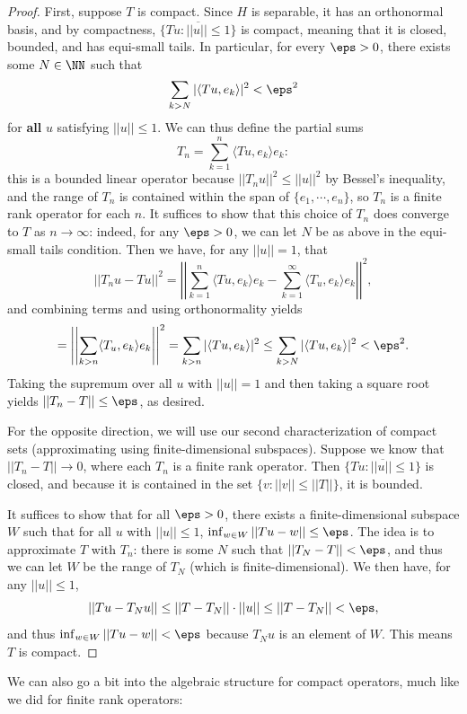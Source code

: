 \begin{proof}
First, suppose $T$ is compact. Since $H$ is separable, it has an orthonormal basis, and by compactness, $\overline{\{Tu: ||u|| \le 1\}}$ is compact, meaning that it is closed, bounded, and has equi-small tails. In particular, for every $\eps > 0$, there exists some $N \in \NN$ such that 
\[
    \sum_{k>N}|\langle Tu, e_k \rangle|^2 < \eps^2
\]
for \textbf{all} $u$ satisfying $||u|| \le 1$. We can thus define the partial sums
\[
    T_n = \sum_{k=1}^n \langle Tu, e_k \rangle e_k:
\]
this is a bounded linear operator because $||T_n u||^2 \le ||u||^2$ by Bessel's inequality, and the range of $T_n$ is contained within the span of $\{e_1, \cdots, e_n\}$, so $T_n$ is a finite rank operator for each $n$. It suffices to show that this choice of $T_n$ does converge to $T$ as $n \to \infty$: indeed, for any $\eps > 0$, we can let $N$ be as above in the equi-small tails condition. Then we have, for any $||u|| = 1$, that
\[
    ||T_n u - Tu||^2 = \left|\left| \sum_{k=1}^n \langle Tu, e_k \rangle e_k - \sum_{k=1}^{\infty} \langle T_u, e_k \rangle e_k \right|\right|^2,
\]
and combining terms and using orthonormality yields
\[
    = \left|\left| \sum_{k> n} \langle T_u, e_k \rangle e_k \right|\right|^2 = \sum_{k>n} |\langle Tu, e_k \rangle|^2 \le \sum_{k>N} |\langle Tu, e_k \rangle|^2 < \eps^2.
\]
Taking the supremum over all $u$ with $||u|| = 1$ and then taking a square root yields $||T_n - T|| \le \eps$, as desired.

For the opposite direction, we will use our second characterization of compact sets (approximating using finite-dimensional subspaces). Suppose we know that $||T_n - T|| \to 0$, where each $T_n$ is a finite rank operator. Then $\overline{\{Tu: ||u|| \le 1\}}$ is closed, and because it is contained in the set $\{v: ||v|| \le ||T||\}$, it is bounded.

It suffices to show that for all $\eps > 0$, there exists a finite-dimensional subspace $W$ such that for all $u$ with $||u|| \le 1$, $\inf_{w \in W} ||Tu - w|| \le \eps$. The idea is to approximate $T$ with $T_n$: there is some $N$ such that $||T_N - T|| < \eps$, and thus we can let $W$ be the range of $T_N$ (which is finite-dimensional). We then have, for any $||u|| \le 1$,
\[
    ||Tu - T_Nu|| \le ||T - T_N|| \cdot ||u|| \le ||T - T_N|| < \eps,
\]
and thus $\inf_{w \in W} ||Tu - w|| < \eps$ because $T_Nu$ is an element of $W$. This means $T$ is compact. 
\end{proof}

We can also go a bit into the algebraic structure for compact operators, much like we did for finite rank operators:

